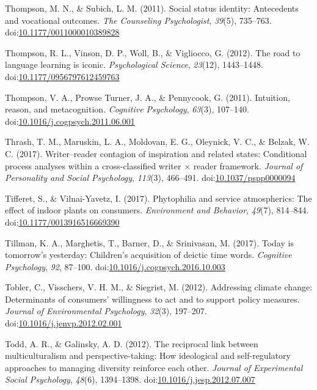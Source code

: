 \documentclass[english,man]{apa6}
\theoremstyle{definition}
\theoremstyle{definition}
\theoremstyle{definition}
\theoremstyle{remark}
\begin{document}
\hypertarget{ref-Thompson2011}{}
Thompson, M. N., \& Subich, L. M. (2011). Social status identity:
Antecedents and vocational outcomes. \emph{The Counseling Psychologist},
\emph{39}(5), 735--763.
doi:\href{https://doi.org/10.1177/0011000010389828}{10.1177/0011000010389828}

\hypertarget{ref-Thompson2012}{}
Thompson, R. L., Vinson, D. P., Woll, B., \& Vigliocco, G. (2012). The
road to language learning is iconic. \emph{Psychological Science},
\emph{23}(12), 1443--1448.
doi:\href{https://doi.org/10.1177/0956797612459763}{10.1177/0956797612459763}

\hypertarget{ref-Thompson2011a}{}
Thompson, V. A., Prowse Turner, J. A., \& Pennycook, G. (2011).
Intuition, reason, and metacognition. \emph{Cognitive Psychology},
\emph{63}(3), 107--140.
doi:\href{https://doi.org/10.1016/j.cogpsych.2011.06.001}{10.1016/j.cogpsych.2011.06.001}

\hypertarget{ref-Thrash2017}{}
Thrash, T. M., Maruskin, L. A., Moldovan, E. G., Oleynick, V. C., \&
Belzak, W. C. (2017). Writer--reader contagion of inspiration and
related states: Conditional process analyses within a cross-classified
writer × reader framework. \emph{Journal of Personality and Social
Psychology}, \emph{113}(3), 466--491.
doi:\href{https://doi.org/10.1037/pspp0000094}{10.1037/pspp0000094}

\hypertarget{ref-Tifferet2017}{}
Tifferet, S., \& Vilnai-Yavetz, I. (2017). Phytophilia and service
atmospherics: The effect of indoor plants on consumers.
\emph{Environment and Behavior}, \emph{49}(7), 814--844.
doi:\href{https://doi.org/10.1177/0013916516669390}{10.1177/0013916516669390}

\hypertarget{ref-Tillman2017}{}
Tillman, K. A., Marghetis, T., Barner, D., \& Srinivasan, M. (2017).
Today is tomorrow's yesterday: Children's acquisition of deictic time
words. \emph{Cognitive Psychology}, \emph{92}, 87--100.
doi:\href{https://doi.org/10.1016/j.cogpsych.2016.10.003}{10.1016/j.cogpsych.2016.10.003}

\hypertarget{ref-Tobler2012}{}
Tobler, C., Visschers, V. H. M., \& Siegrist, M. (2012). Addressing
climate change: Determinants of consumers' willingness to act and to
support policy measures. \emph{Journal of Environmental Psychology},
\emph{32}(3), 197--207.
doi:\href{https://doi.org/10.1016/j.jenvp.2012.02.001}{10.1016/j.jenvp.2012.02.001}

\hypertarget{ref-Todd2012}{}
Todd, A. R., \& Galinsky, A. D. (2012). The reciprocal link between
multiculturalism and perspective-taking: How ideological and
self-regulatory approaches to managing diversity reinforce each other.
\emph{Journal of Experimental Social Psychology}, \emph{48}(6),
1394--1398.
doi:\href{https://doi.org/10.1016/j.jesp.2012.07.007}{10.1016/j.jesp.2012.07.007}
\end{document}
